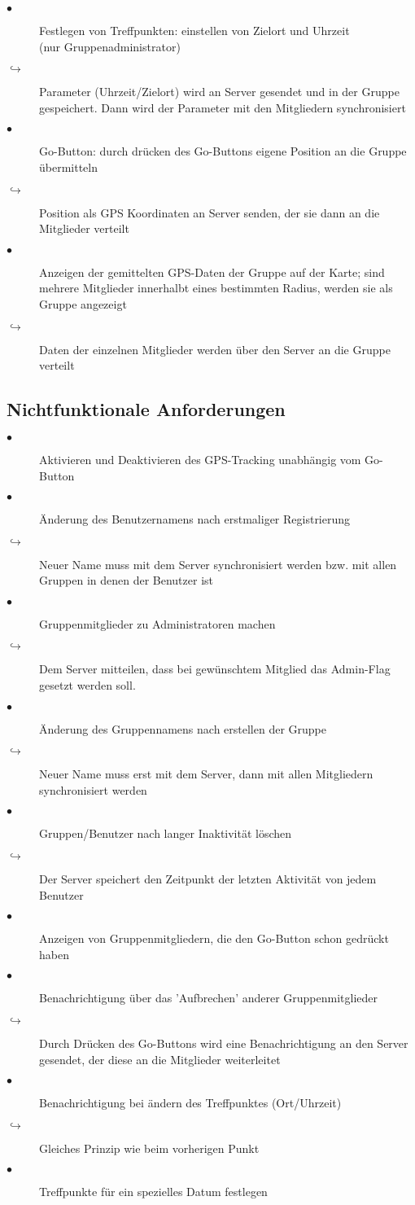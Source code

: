 \begin{description}
\item[$\bullet$] Festlegen von Treffpunkten: einstellen von Zielort und Uhrzeit\\(nur Gruppenadministrator)
\item[$\hookrightarrow$] Parameter (Uhrzeit/Zielort) wird an Server gesendet und in der Gruppe gespeichert. Dann wird der Parameter mit den Mitgliedern synchronisiert
\item[$\bullet$] Go-Button: durch drücken des Go-Buttons eigene Position an die Gruppe übermitteln
\item[$\hookrightarrow$] Position als GPS Koordinaten an Server senden, der sie dann an die Mitglieder verteilt
\item[$\bullet$] Anzeigen der gemittelten GPS-Daten der Gruppe auf der Karte; sind mehrere Mitglieder innerhalbt eines bestimmten Radius,
     werden sie als Gruppe angezeigt
\item[$\hookrightarrow$] Daten der einzelnen Mitglieder werden über den Server an die Gruppe verteilt
\end{description}
\subsection{Nichtfunktionale Anforderungen}
\begin{description}
\item[$\bullet$] Aktivieren und Deaktivieren des GPS-Tracking unabhängig vom Go-Button
\item[$\bullet$] Änderung des Benutzernamens nach erstmaliger Registrierung
\item[$\hookrightarrow$] Neuer Name muss mit dem Server synchronisiert werden bzw. mit allen Gruppen in denen der Benutzer ist
\item[$\bullet$] Gruppenmitglieder zu Administratoren machen
\item[$\hookrightarrow$] Dem Server mitteilen, dass bei gewünschtem Mitglied das Admin-Flag gesetzt werden soll.
\item[$\bullet$] Änderung des Gruppennamens nach erstellen der Gruppe
\item[$\hookrightarrow$] Neuer Name muss erst mit dem Server, dann mit allen Mitgliedern synchronisiert werden
\item[$\bullet$] Gruppen/Benutzer nach langer Inaktivität löschen
\item[$\hookrightarrow$] Der Server speichert den Zeitpunkt der letzten Aktivität von jedem Benutzer
\item[$\bullet$] Anzeigen von Gruppenmitgliedern, die den Go-Button schon gedrückt haben
\item[$\bullet$] Benachrichtigung über das 'Aufbrechen' anderer Gruppenmitglieder
\item[$\hookrightarrow$] Durch Drücken des Go-Buttons wird eine Benachrichtigung an den Server gesendet, der diese an die Mitglieder weiterleitet
\item[$\bullet$] Benachrichtigung bei ändern des Treffpunktes (Ort/Uhrzeit)
\item[$\hookrightarrow$] Gleiches Prinzip wie beim vorherigen Punkt
\item[$\bullet$] Treffpunkte für ein spezielles Datum festlegen
\end{description}
